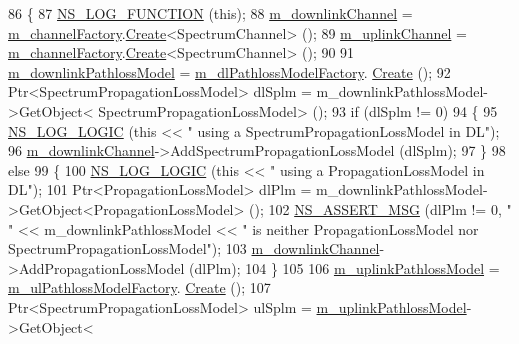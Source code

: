 \begin{DoxyCode}
86 \{
87   \hyperlink{log-macros-disabled_8h_a90b90d5bad1f39cb1b64923ea94c0761}{NS\_LOG\_FUNCTION} (\textcolor{keyword}{this});
88   \hyperlink{classns3_1_1LteHelper_a5c2237946550d801d80c0d0bee0b4cfb}{m\_downlinkChannel} = \hyperlink{classns3_1_1LteHelper_a31d833547d5db8c7a040ce65f328c529}{m\_channelFactory}.\hyperlink{classns3_1_1ObjectFactory_a18152e93f0a6fe184ed7300cb31e9896}{Create}<SpectrumChannel> ();
89   \hyperlink{classns3_1_1LteHelper_ad61b21e2f55749e680942016b2e57abe}{m\_uplinkChannel} = \hyperlink{classns3_1_1LteHelper_a31d833547d5db8c7a040ce65f328c529}{m\_channelFactory}.\hyperlink{classns3_1_1ObjectFactory_a18152e93f0a6fe184ed7300cb31e9896}{Create}<SpectrumChannel> ();
90 
91   \hyperlink{classns3_1_1LteHelper_ab60aa166b387a0ed56d54ff7db31b0f0}{m\_downlinkPathlossModel} = \hyperlink{classns3_1_1LteHelper_a1e60fb862e68676d8aabb29e2ea2dfd9}{m\_dlPathlossModelFactory}.
      \hyperlink{classns3_1_1ObjectFactory_a18152e93f0a6fe184ed7300cb31e9896}{Create} ();
92   Ptr<SpectrumPropagationLossModel> dlSplm = m\_downlinkPathlossModel->GetObject<
      SpectrumPropagationLossModel> ();
93   \textcolor{keywordflow}{if} (dlSplm != 0)
94     \{
95       \hyperlink{group__logging_ga88acd260151caf2db9c0fc84997f45ce}{NS\_LOG\_LOGIC} (\textcolor{keyword}{this} << \textcolor{stringliteral}{" using a SpectrumPropagationLossModel in DL"});
96       \hyperlink{classns3_1_1LteHelper_a5c2237946550d801d80c0d0bee0b4cfb}{m\_downlinkChannel}->AddSpectrumPropagationLossModel (dlSplm);
97     \}
98   \textcolor{keywordflow}{else}
99     \{
100       \hyperlink{group__logging_ga88acd260151caf2db9c0fc84997f45ce}{NS\_LOG\_LOGIC} (\textcolor{keyword}{this} << \textcolor{stringliteral}{" using a PropagationLossModel in DL"});
101       Ptr<PropagationLossModel> dlPlm = m\_downlinkPathlossModel->GetObject<PropagationLossModel> ();
102       \hyperlink{assert_8h_aff5ece9066c74e681e74999856f08539}{NS\_ASSERT\_MSG} (dlPlm != 0, \textcolor{stringliteral}{" "} << m\_downlinkPathlossModel << \textcolor{stringliteral}{" is neither
       PropagationLossModel nor SpectrumPropagationLossModel"});
103       \hyperlink{classns3_1_1LteHelper_a5c2237946550d801d80c0d0bee0b4cfb}{m\_downlinkChannel}->AddPropagationLossModel (dlPlm);
104     \}
105 
106   \hyperlink{classns3_1_1LteHelper_a0b121aecc2a13aab12908c8547ba336b}{m\_uplinkPathlossModel} = \hyperlink{classns3_1_1LteHelper_a2743f7987fdd7372b7a976a8488e3827}{m\_ulPathlossModelFactory}.
      \hyperlink{classns3_1_1ObjectFactory_a18152e93f0a6fe184ed7300cb31e9896}{Create} ();
107   Ptr<SpectrumPropagationLossModel> ulSplm = \hyperlink{classns3_1_1LteHelper_a0b121aecc2a13aab12908c8547ba336b}{m\_uplinkPathlossModel}->GetObject<

\end{DoxyCode}

